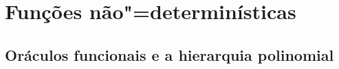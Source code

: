 \chapter{Funções não"=determinísticas}






\section{Oráculos funcionais e a hierarquia polinomial}
